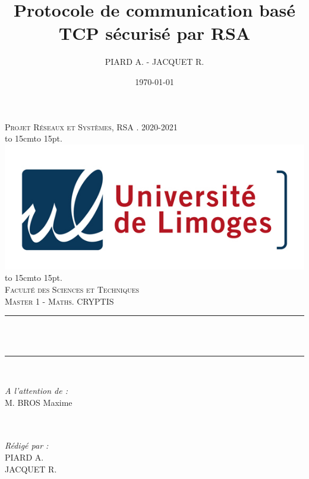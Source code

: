 \documentclass[12pt]{article}
\title{Protocole de communication basé TCP sécurisé par RSA}
\author{PIARD A. - JACQUET R.}
\date{\today}
\makeatletter
\let\thetitle\@title
\def\dotfill#1{\cleaders\hbox to #1{.}\hfill}
\newcommand\dotline[2][.5em]{\leavevmode\hbox to #2{\dotfill{#1}\hfil}}
\theoremstyle{definition}
\makeatother
\begin{document}

\begin{titlepage}
	\centering
    \vspace*{0.5 cm}
    \textsc{\LARGE Projet Réseaux et Systèmes, RSA . 2020-2021}\\[1.0 cm]
    \dotline[15pt]{15cm}\\
	\includegraphics[scale = 2.2]{logo.png}
	\dotline[15pt]{15cm}\\
	\vspace{1.5cm}
	\textsc{\Large Faculté des Sciences et Techniques}\\
	\textsc{\large Master 1 - Maths. CRYPTIS}\\[1.0 cm]
	\rule{\linewidth}{0.2 mm} \\[0.4 cm]
	{ \huge \bfseries \color{blue} \thetitle}\\
	\rule{\linewidth}{0.2 mm} \\[1.5 cm]
	
	\begin{minipage}{0.4\textwidth}
		\begin{flushleft} \large
			\emph{A l'attention de :}\\
			M. BROS Maxime\\
			\phantom{a}\\
			\phantom{a}\\
		\end{flushleft}
	\end{minipage}
	\begin{minipage}{0.5\textwidth}
    	\begin{flushright} \large
		\emph{Rédigé par :}\\
		PIARD A.\\
		JACQUET R.\\
		\end{flushright}
	\end{minipage}\\[2 cm]
\end{titlepage}
\end{document}
